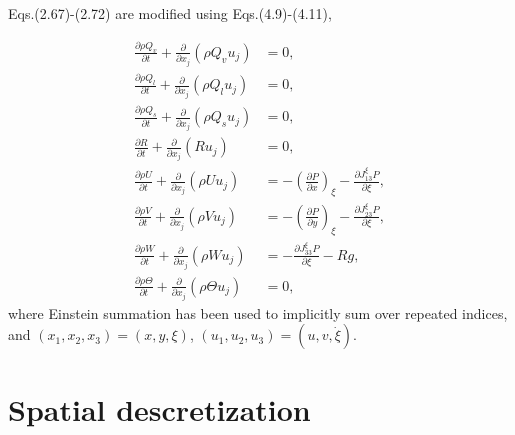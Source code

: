 Eqs.(2.67)-(2.72) are modified using Eqs.(4.9)-(4.11), 

\begin{align}
 \frac{\partial \rho Q_v     }{\partial t} + \frac{\partial}{\partial x_j} \left( \rho Q_v             u_j \right) &= 0, \\
 \frac{\partial \rho Q_l     }{\partial t} + \frac{\partial}{\partial x_j} \left( \rho Q_l             u_j \right) &= 0, \\
 \frac{\partial \rho Q_s     }{\partial t} + \frac{\partial}{\partial x_j} \left( \rho Q_s             u_j \right) &= 0, \\
 \frac{\partial R            }{\partial t} + \frac{\partial}{\partial x_j} \left( R                    u_j \right) &= 0, \\
 \frac{\partial \rho U       }{\partial t} + \frac{\partial}{\partial x_j} \left( \rho U         u_j \right) 
                   &= - \left(\frac{\partial P}{\partial x}\right)_{\xi} - \frac{\partial J^{\xi}_{13} P}{\partial \xi}, \\
 \frac{\partial \rho V       }{\partial t} + \frac{\partial}{\partial x_j} \left( \rho V         u_j \right) 
                   &= - \left(\frac{\partial P}{\partial y}\right)_{\xi} - \frac{\partial J^{\xi}_{23} P}{\partial \xi}, \\
 \frac{\partial \rho W       }{\partial t} + \frac{\partial}{\partial x_j} \left( \rho W         u_j \right)
                   &= - \frac{\partial J^{\xi}_{33} P}{\partial \xi} - Rg,                                                \\
 \frac{\partial \rho \Theta  }{\partial t} + \frac{\partial}{\partial x_j} \left( \rho \Theta          u_j \right) &= 0, 
\end{align}
where Einstein summation has been used to implicitly sum over repeated indices, 
and $(x_1,x_2,x_3)=(x,y,\xi)$, $(u_1,u_2,u_3)=(u,v,\dot{\xi})$. 

\section{Spatial descretization}
